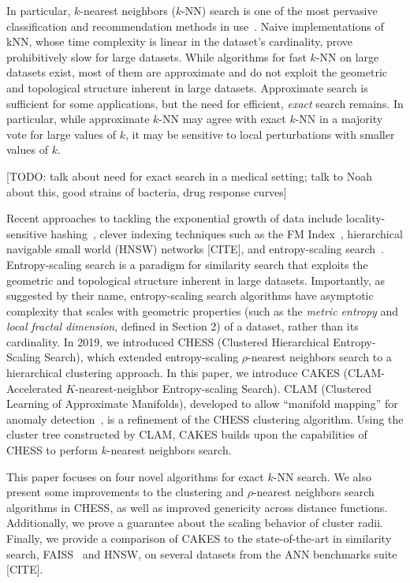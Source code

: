In particular, $k$-nearest neighbors ($k$-NN) search is one of the most pervasive classification and recommendation methods in use~\cite{fix1952discriminatory, cover1967nearest}. 
Naive implementations of kNN, whose time complexity is linear in the dataset's cardinality, 
prove prohibitively slow for large datasets. While algorithms for fast $k$-NN on large datasets exist, most of them are approximate and do not 
exploit the geometric and topological structure inherent in large datasets. Approximate search is sufficient for some applications, but the 
need for efficient, \emph{exact} search remains.
In particular, while approximate $k$-NN may agree with exact $k$-NN in a majority vote for large values of $k$, it may be sensitive to local perturbations with smaller values of $k$.

[TODO: talk about need for exact search in a medical setting; talk to Noah about this, good strains of bacteria, drug response curves]

Recent approaches to tackling the exponential growth of data include locality-sensitive hashing~\cite{indyk1999sublinear}, 
clever indexing techniques such as the FM Index~\cite{simpson2010efficient}, hierarchical navigable small world (HNSW) networks [CITE], and entropy-scaling search~\cite{yu2015entropy, ishaq2019clustered}. 
Entropy-scaling search is a paradigm for similarity search that exploits the geometric and topological structure inherent in large datasets.
Importantly, as suggested by their name, entropy-scaling search algorithms have asymptotic complexity that scales with geometric properties (such as the 
\emph{metric entropy} and \emph{local fractal dimension}, defined in Section 2) of a dataset,
rather than its cardinality. In 2019, we introduced CHESS (Clustered Hierarchical Entropy-Scaling Search), which extended entropy-scaling $\rho$-nearest 
neighbors search to a hierarchical clustering approach. In this paper, we introduce CAKES (CLAM-Accelerated $K$-nearest-neighbor 
Entropy-scaling Search). CLAM (Clustered Learning of Approximate Manifolds), developed to allow ``manifold mapping'' for anomaly detection~\cite{ishaq2021clustered}, is a refinement of the CHESS clustering algorithm. 
Using the cluster tree constructed by CLAM, CAKES builds upon the capabilities of CHESS to perform
$k$-nearest neighbors search. 


This paper focuses on four novel algorithms for exact $k$-NN search. We also present some 
improvements to the clustering and $\rho$-nearest neighbors search algorithms in CHESS, 
as well as improved genericity across distance functions. Additionally, we prove a guarantee about the scaling behavior of cluster radii. 
Finally, we provide a comparison of 
CAKES to the state-of-the-art in similarity search, FAISS~\cite{johnson2019billion} and HNSW, on several datasets 
from the ANN benchmarks suite [CITE].
